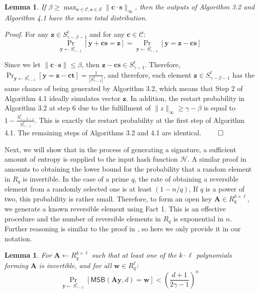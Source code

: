 \documentclass{article}
\theoremstyle{plain}
\newtheorem{lemma}[theorem]{Lemma}
\theoremstyle{definition}
\begin{document}
    \begin{lemma}
    If $\beta \geq \max_{\mathbf{c} \in \mathcal{C}, \mathbf{s} \in \mathcal{S}} \|\mathbf{c} \cdot \mathbf{s}\|_\infty$, then the outputs of Algorithm 3.2 and Algorithm 4.1 have the same total distribution.
    \end{lemma}

    \emph{Proof.} For any $\mathbf{z} \in S^{\ell}_{\gamma - \beta - 1}$ and for any $\mathbf{c} \in \mathcal{C}$:
        $$
        \Pr\limits_{\mathbf{y} \leftarrow S^{\ell}_{\gamma-1}}[\mathbf{y} + \mathbf{cs} = \mathbf{z}] = \Pr\limits_{\mathbf{y} \leftarrow S^{\ell}_{\gamma-1}}[\mathbf{y} = \mathbf{z} - \mathbf{cs}]
        $$

    Since we let $\|\mathbf{c} \cdot \mathbf{s}\| \leq \beta$, then $\mathbf{z} - \mathbf{cs} \in S^{\ell}_{\gamma - 1}$. Therefore, $\Pr_{\mathbf{y} \leftarrow S^{\ell}_{\gamma-1}}[\mathbf{y} = \mathbf{z} - \mathbf{ct}] = \frac{1}{|S^{\ell}_{\gamma - 1}|}$, and therefore, each element $\mathbf{z} \in S^{\ell}_{\gamma - \beta - 1}$ has the same chance of being generated by Algorithm 3.2, which means that Step 2 of Algorithm 4.1 ideally simulates vector $\mathbf{z}$. In addition, the restart probability in Algorithm 3.2 at step 6 due to the fulfillment of $\|z\|_\infty \geq \gamma - \beta$ is equal to $1 - \frac{S^{\ell}_{\gamma-\beta-1}}{S^{\ell}_{\gamma-1}}$. This is exactly the restart probability at the first step of Algorithm 4.1. The remaining steps of Algorithms 3.2 and 4.1 are identical. $\qed$

    Next, we will show that in the process of generating a signature, a sufficient amount of entropy is supplied to the input hash function $\mathcal{H}$. A similar proof in \cite[Appendix C]{KLS18} amounts to obtaining the lower bound for the probability that a random element in $R_q$ is invertible. In the case of a prime $q$, the rate of obtaining a reversible element from a randomly selected one is at least $(1 - n/q)$, If $q$ is a power of two, this probability is rather small. Therefore, to form an open key $\mathbf{A} \in R^{k \times \ell}_{q}$, we generate a known reversible element using Fact 1. This is an effective procedure and the number of reversible elements in $R_q$ is exponential in $n$. Further reasoning is similar to the proof in \cite[Appendix C]{KLS18}, so here we only provide it in our notation.

    \begin{lemma}
    For $\mathbf{A} \leftarrow R^{k \times \ell}_q$ such that at least one of the $k \cdot \ell$ polynomials forming $\mathbf{A}$ is invertible, and for all $\mathbf{w} \in R^{\ell}_q$:
    $$
        \Pr\limits_{\mathbf{y} \leftarrow S^{\ell}_{\gamma - 1}}[\mathsf{MSB}(\mathbf{Ay}, d) = \mathbf{w}] < \left( \frac{d + 1}{2\gamma - 1} \right)^n
    $$
    \end{lemma}
\end{document}
